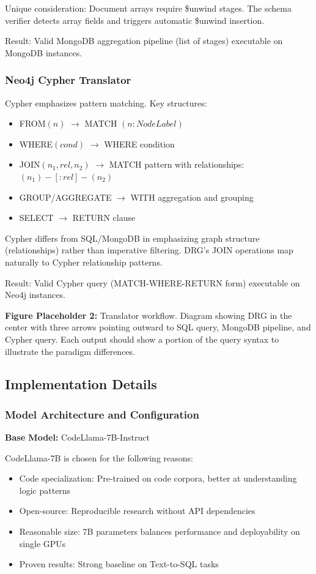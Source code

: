 \documentclass[conference]{IEEEtran}
\begin{document}
Unique consideration: Document arrays require \$unwind stages. The schema verifier detects array fields and triggers automatic \$unwind insertion.

Result: Valid MongoDB aggregation pipeline (list of stages) executable on MongoDB instances.

\subsubsection{Neo4j Cypher Translator}

Cypher emphasizes pattern matching. Key structures:
\begin{itemize}
\item FROM$(n)$ $\to$ MATCH $(n:NodeLabel)$
\item WHERE$(cond)$ $\to$ WHERE condition
\item JOIN$(n_1, rel, n_2)$ $\to$ MATCH pattern with relationships: $(n_1)-[:rel]-(n_2)$
\item GROUP/AGGREGATE $\to$ WITH aggregation and grouping
\item SELECT $\to$ RETURN clause
\end{itemize}

Cypher differs from SQL/MongoDB in emphasizing graph structure (relationships) rather than imperative filtering. DRG's JOIN operations map naturally to Cypher relationship patterns.

Result: Valid Cypher query (MATCH-WHERE-RETURN form) executable on Neo4j instances.

\textbf{Figure Placeholder 2:} Translator workflow. Diagram showing DRG in the center with three arrows pointing outward to SQL query, MongoDB pipeline, and Cypher query. Each output should show a portion of the query syntax to illustrate the paradigm differences.

\subsection{Implementation Details}

\subsubsection{Model Architecture and Configuration}

\textbf{Base Model:} CodeLlama-7B-Instruct

CodeLlama-7B is chosen for the following reasons:
\begin{itemize}
\item Code specialization: Pre-trained on code corpora, better at understanding logic patterns
\item Open-source: Reproducible research without API dependencies
\item Reasonable size: 7B parameters balances performance and deployability on single GPUs
\item Proven results: Strong baseline on Text-to-SQL tasks \cite{c23}
\end{itemize}
\end{document}

